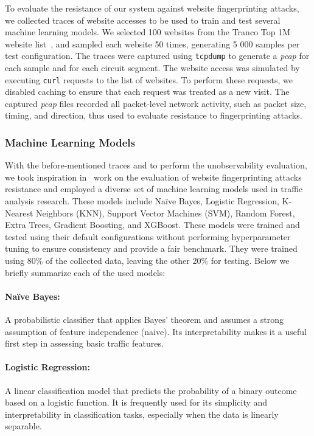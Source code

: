 To evaluate the resistance of our system against website fingerprinting attacks, we collected traces of website accesses to be used to train and test several machine learning models. We selected 100 websites from the Tranco Top 1M website list~\cite{LePochat2019}, and sampled each website 50 times, generating 5 000 samples per test configuration. The traces were captured using \texttt{tcpdump} to generate a \textit{pcap} for each sample and for each circuit segment. The website access was simulated by executing \texttt{curl} requests to the list of websites. To perform these requests, we disabled caching to ensure that each request was treated as a new visit. The captured \textit{pcap} files recorded all packet-level network activity, such as packet size, timing, and direction, thus used to evaluate resistance to fingerprinting attacks. 

\subsubsection{Machine Learning Models}

With the before-mentioned traces and to perform the unobservability evaluation, we took inspiration in~\autocite{MIRACE} work on the evaluation of website fingerprinting attacks resistance and employed a diverse set of machine learning models used in traffic analysis research. These models include Naïve Bayes, Logistic Regression, K-Nearest Neighbors (KNN), Support Vector Machines (SVM), Random Forest, Extra Trees, Gradient Boosting, and XGBoost. These models were trained and tested using their default configurations without performing hyperparameter tuning to ensure consistency and provide a fair benchmark. They were trained using 80\% of the collected data, leaving the other 20\% for testing. Below we briefly summarize each of the used models:

\paragraph{Naïve Bayes:} A probabilistic classifier that applies Bayes' theorem and assumes a strong assumption of feature independence (naive). Its interpretability makes it a useful first step in assessing basic traffic features.
\paragraph{Logistic Regression:} A linear classification model that predicts the probability of a binary outcome based on a logistic function. It is frequently used for its simplicity and interpretability in classification tasks, especially when the data is linearly separable.
